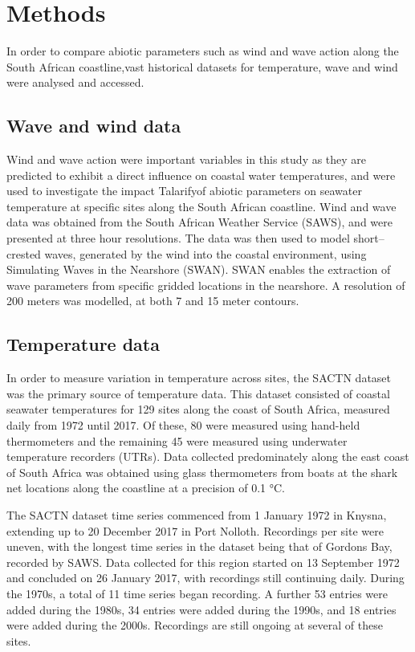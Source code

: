 \documentclass[12pt,]{article}
\begin{document}
\newpage

\section{Methods}\label{methods}

In order to compare abiotic parameters such as wind and wave action
along the South African coastline,vast historical datasets for
temperature, wave and wind were analysed and accessed.

\subsection{Wave and wind data}\label{wave-and-wind-data}

Wind and wave action were important variables in this study as they are
predicted to exhibit a direct influence on coastal water temperatures,
and were used to investigate the impact Talarifyof abiotic parameters on
seawater temperature at specific sites along the South African
coastline. Wind and wave data was obtained from the South African
Weather Service (SAWS), and were presented at three hour resolutions.
The data was then used to model short--crested waves, generated by the
wind into the coastal environment, using Simulating Waves in the
Nearshore (SWAN). SWAN enables the extraction of wave parameters from
specific gridded locations in the nearshore. A resolution of 200 meters
was modelled, at both 7 and 15 meter contours.

\subsection{Temperature data}\label{temperature-data}

In order to measure variation in temperature across sites, the SACTN
dataset was the primary source of temperature data. This dataset
consisted of coastal seawater temperatures for 129 sites along the coast
of South Africa, measured daily from 1972 until 2017. Of these, 80 were
measured using hand-held thermometers and the remaining 45 were measured
using underwater temperature recorders (UTRs). Data collected
predominately along the east coast of South Africa was obtained using
glass thermometers from boats at the shark net locations along the
coastline at a precision of 0.1 °C.

The SACTN dataset time series commenced from 1 January 1972 in Knysna,
extending up to 20 December 2017 in Port Nolloth. Recordings per site
were uneven, with the longest time series in the dataset being that of
Gordons Bay, recorded by SAWS. Data collected for this region started on
13 September 1972 and concluded on 26 January 2017, with recordings
still continuing daily. During the 1970s, a total of 11 time series
began recording. A further 53 entries were added during the 1980s, 34
entries were added during the 1990s, and 18 entries were added during
the 2000s. Recordings are still ongoing at several of these sites.
\end{document}
